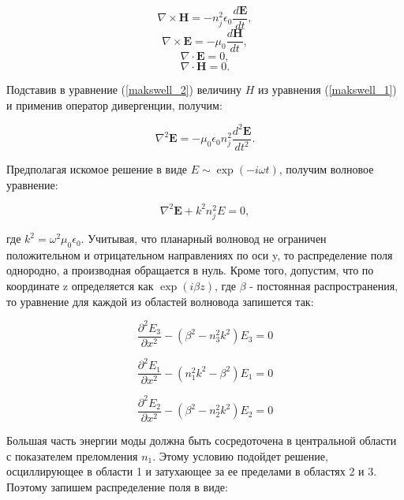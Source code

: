 \begin{equation}
 	\nabla\times \mathbf{H} = -n_j^2\epsilon_0 \frac{d\mathbf{E}}{dt},
 	\label{makswell_1}
\end{equation}
\begin{equation}
	\nabla\times \mathbf{E} = -\mu_0\frac{d\mathbf{H}}{dt},
  	\label{makswell_2}
\end{equation}
\begin{equation}
 	\nabla\cdot \mathbf{E} = 0,
 	\label{makswell_3}
\end{equation}
\begin{equation}
 	\nabla\cdot \mathbf{H} = 0.
 	\label{makswell_4} 
\end{equation}

Подставив в уравнение (\ref{makswell_2}) величину $H$ из уравнения (\ref{makswell_1}) и применив оператор дивергенции, получим:

\begin{equation}
	\nabla^2\mathbf{E} = -\mu_0\epsilon_0 n_j^2 \frac{d^2\mathbf{E}}{dt^2}.
\end{equation}

Предполагая искомое решение в виде $E \sim \exp(-i\omega t)$, получим волновое уравнение:

\begin{equation}
	\nabla^2\mathbf{E} + k^2 n_j^2 E = 0,
\end{equation}

где $k^2 = \omega^2\mu_0 \epsilon_0$. Учитывая, что планарный волновод не ограничен положительном и отрицательном направлениях по оси y, то распределение поля однородно, а производная обращается в нуль. Кроме того, допустим, что по координате z определяется как $\exp(i\beta z)$, где $\beta$ - постоянная распространения, то уравнение для каждой из областей волновода запишется так:

\begin{equation}
	\frac{\partial^2 E_3}{\partial x^2} -(\beta^2 - n_3^2 k^2)E_3 = 0
\end{equation}

\begin{equation}
	\frac{\partial^2 E_1}{\partial x^2} -(n_1^2 k^2 - \beta^2)E_1 = 0
\end{equation}

\begin{equation}
	\frac{\partial^2 E_2}{\partial x^2} -(\beta^2 - n_2^2 k^2)E_2 = 0
\end{equation}

Большая часть энергии моды должна быть сосредоточена в центральной области с показателем преломления $n_1$. Этому условию подойдет решение, осциллирующее в области 1 и затухающее за ее пределами в областях 2 и 3. Поэтому запишем распределение поля в виде:

